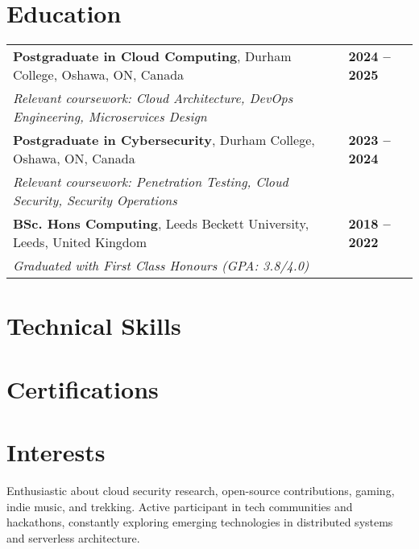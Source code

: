 \documentclass[11pt,a4paper,sans]{moderncv}
\newcommand{\sectionseparator}{\vspace{5pt}\par\noindent\makebox[\linewidth]{\rule{\textwidth}{0.4pt}}\vspace{0pt}}
\begin{document}
\sectionseparator

\section{Education}
\begin{tabular}{@{}p{} p{}@{}}
    \textbf{Postgraduate in Cloud Computing}, Durham College, Oshawa, ON, Canada & \hfill \textbf{2024 -- 2025} \\
    \textit{Relevant coursework: Cloud Architecture, DevOps Engineering, Microservices Design} & \\
    \textbf{Postgraduate in Cybersecurity}, Durham College, Oshawa, ON, Canada & \hfill \textbf{2023 -- 2024} \\
    \textit{Relevant coursework: Penetration Testing, Cloud Security, Security Operations} & \\
    \textbf{BSc. Hons Computing}, Leeds Beckett University, Leeds, United Kingdom & \hfill \textbf{2018 -- 2022} \\
    \textit{Graduated with First Class Honours (GPA: 3.8/4.0)} & \\
\end{tabular}

\sectionseparator

\section{Technical Skills}

\sectionseparator

\section{Certifications}

\sectionseparator

\section{Interests}
Enthusiastic about cloud security research, open-source contributions, gaming, indie music, and trekking. Active participant in tech communities and hackathons, constantly exploring emerging technologies in distributed systems and serverless architecture.
\end{document}
